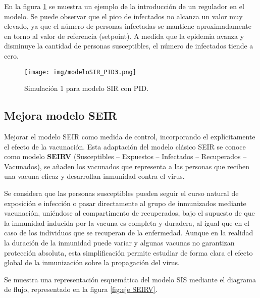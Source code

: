 En la figura \ref{fig:simu3pid} se muestra un ejemplo de la introducción de un regulador en el modelo. Se puede observar que el pico de infectados no alcanza un valor muy elevado, ya que el número de personas infectadas se mantiene aproximadamente en torno al valor de referencia (setpoint). A medida que la epidemia avanza y disminuye la cantidad de personas susceptibles, el número de infectados tiende a cero.
\begin{figure}[H]
    \centering
    \texttt{[image: img/modeloSIR\_PID3.png]}
    \caption{Simulación 1 para modelo SIR con PID.}
    \label{fig:simu3pid}
    \vspace{0.5cm} %
\end{figure}


\subsection{Mejora modelo SEIR}
Mejorar el modelo SEIR como medida de control, incorporando el explícitamente el efecto de la vacunación. Esta adaptación del modelo clásico SEIR se conoce como modelo \textbf{SEIRV} (Susceptibles – Expuestos – Infectados – Recuperados – Vacunados), se añaden los vacunados que representa a las personas que reciben una vacuna eficaz y desarrollan inmunidad contra el virus.

Se considera que las personas susceptibles pueden seguir el curso natural de exposición e infección o pasar directamente al grupo de inmunizados mediante vacunación, uniéndose al compartimento de recuperados, bajo el supuesto de que la inmunidad inducida por la vacuna es completa y duradera, al igual que en el caso de los individuos que se recuperan de la enfermedad. Aunque en la realidad la duración de la inmunidad puede variar y algunas vacunas no garantizan protección absoluta, esta simplificación permite estudiar de forma clara el efecto global de la inmunización sobre la propagación del virus.

Se muestra una representación esquemática del modelo SIS mediante el diagrama de flujo, representado en la figura \ref{fig:eje SEIRV}.

